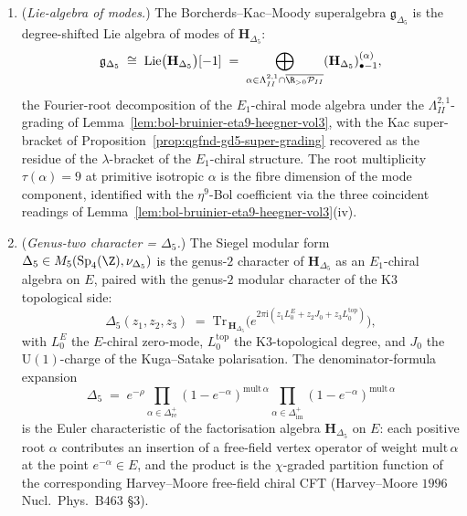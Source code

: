 \begin{remark}
\begin{enumerate}[label=(\roman*),leftmargin=1.5em]
 \[
 p_\ast\mathrm{Obs}^{\mathrm{bulk}}\big|_{\partial} \;=\; \mathbf H_{\Delta_5}
 \]
 holds as $E_1$-chiral algebras on $E$, valued in the stable $\infty$-category of $\Z$-graded complexes with the Mukai-pairing CY-$3$ structure of Remark~\ref{rem:hochcalc-theoremH-CY3-scope}. Primary: Beilinson--Drinfeld $2004$ \emph{Chiral Algebras} \S$3.4.11$ ($E_1$-chiral = associative $\otimes$ holomorphic on $E$); Costello $2013$ \S$5$ (boundary BV-pushforward); Francis $2013$ Adv.\ Math.\ $239$ Thm.\ $1.1$ ($E_n$ Hochschild concentration in $\{0,\ldots,n+1\}$).
 \item (\emph{Lie-algebra of modes.}) The Borcherds--Kac--Moody superalgebra $\mathfrak g_{\Delta_5}$ is the degree-shifted Lie algebra of modes of $\mathbf H_{\Delta_5}$:
 \[
 \mathfrak g_{\Delta_5} \;\cong\; \mathrm{Lie}\bigl(\mathbf H_{\Delta_5}\bigr)[-1]
 \;=\; \bigoplus_{\alpha\in\Lambda^{2,1}_{II}\cap\overline{\R_{>0}\mathcal P_{II}}} (\mathbf H_{\Delta_5})^{(\alpha)}_{\bullet-1},
 \]
 the Fourier-root decomposition of the $E_1$-chiral mode algebra under the $\Lambda^{2,1}_{II}$-grading of Lemma~\ref{lem:bol-bruinier-eta9-heegner-vol3}, with the Kac super-bracket of Proposition~\ref{prop:qgfnd-gd5-super-grading} recovered as the residue of the $\lambda$-bracket of the $E_1$-chiral structure. The root multiplicity $\tau(\alpha)=9$ at primitive isotropic $\alpha$ is the fibre dimension of the mode component, identified with the $\eta^9$-Bol coefficient via the three coincident readings of Lemma~\ref{lem:bol-bruinier-eta9-heegner-vol3}(iv).
 \item (\emph{Genus-two character = $\Delta_5$.}) The Siegel modular form $\Delta_5\in M_5(\mathrm{Sp}_4(\Z),\nu_{\Delta_5})$ is the genus-$2$ character of $\mathbf H_{\Delta_5}$ as an $E_1$-chiral algebra on $E$, paired with the genus-$2$ modular character of the K3 topological side:
 \[
 \Delta_5(z_1,z_2,z_3) \;=\; \mathrm{Tr}_{\,\mathbf H_{\Delta_5}}\bigl(e^{2\pi\mathrm i(z_1 L_0^{E} + z_2 J_0 + z_3 L_0^{\mathrm{top}})}\bigr),
 \]
 with $L_0^E$ the $E$-chiral zero-mode, $L_0^{\mathrm{top}}$ the K3-topological degree, and $J_0$ the $\mathrm U(1)$-charge of the Kuga--Satake polarisation. The denominator-formula expansion
 \[
 \Delta_5 \;=\; e^{-\rho}\!\!\prod_{\alpha\in\Delta^+_{\mathrm{re}}}(1-e^{-\alpha})^{\mathrm{mult}\,\alpha}\prod_{\alpha\in\Delta^+_{\mathrm{im}}}(1-e^{-\alpha})^{\mathrm{mult}\,\alpha}
 \]
 is the Euler characteristic of the factorisation algebra $\mathbf H_{\Delta_5}$ on $E$: each positive root $\alpha$ contributes an insertion of a free-field vertex operator of weight $\mathrm{mult}\,\alpha$ at the point $e^{-\alpha}\in E$, and the product is the $\chi$-graded partition function of the corresponding Harvey--Moore free-field chiral CFT (Harvey--Moore $1996$ Nucl.\ Phys.\ B$463$ \S$3$).

\end{enumerate}
\end{remark}
